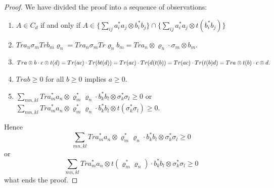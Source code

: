 \documentclass[10pt,a4paper]{amsart}
\begin{document}
\begin{proof}
We have divided the proof into a sequence of observations:
\begin{enumerate}
\item $A \in C_d$ if and only if $A \in \{ \sum_{ij} a^*_i a_j \otimes b^*_ib_j \} \cap \{ \sum_{ij} a^*_i a_j \otimes t(b^*_i b_j) \}$
\item $Tr a_n\sigma_m Tr b_m \varrho_n = Tr a_n \sigma_m Tr \varrho_n b_m = Tr a_n \otimes \varrho_n \cdot \sigma_m \otimes b_m.$
\item $Tr a \otimes b \cdot c \otimes t(d) = Tr( ac) \cdot  Tr (bt(d)) = Tr( ac) \cdot  Tr (d(t(b))  \\
= Tr( ac) \cdot  Tr( t(b) d) = Tr a \otimes t(b) \cdot c \otimes d.$
\item $Tr ab \geq 0$ for all $b \geq 0$ implies $a \geq 0$.
\item $\sum_{mn,kl} Tr a^*_m a_n \otimes \varrho^*_m \varrho_n \cdot b^*_k b_l \otimes \sigma ^*_k \sigma_l \geq 0$
or
$\sum_{mn,kl} Tr a^*_m a_n \otimes \varrho^*_m \varrho_n \cdot b^*_k b_l \otimes t(\sigma ^*_k \sigma_l) \geq 0$.
\end{enumerate}
Hence
$$\sum_{mn,kl} Tr a^*_m a_n \otimes \varrho^*_m \varrho_n \cdot b^*_k b_l \otimes \sigma ^*_k \sigma_l \geq 0$$
or
$$\sum_{mn,kl} Tr a^*_m a_n \otimes t(\varrho^*_m \varrho_n) \cdot b^*_k b_l \otimes \sigma ^*_k \sigma_l \geq 0$$
what ends the proof.
\end{proof}
\end{document}
